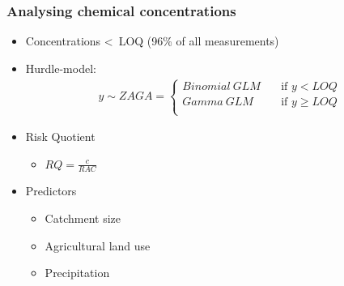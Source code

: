 \documentclass[
	12pt
	]{beamer}
\begin{document}
\begin{frame}
\frametitle{Analysing chemical concentrations}
	\begin{itemize}
		\pause
		\item Concentrations \textless~LOQ (96\% of all measurements)
		\pause
		\item Hurdle-model: 
			\begin{align*}
			y \sim ZAGA = 
			  \begin{cases}
			    Binomial~GLM   & \quad  \text{if } y < LOQ \\
			    Gamma~GLM & \quad \text{if } y \ge LOQ \\
			  \end{cases}
			\end{align*}
		\pause
		\item Risk Quotient
			\begin{itemize}
				\item \large $RQ = \frac{c}{RAC}$
			\end{itemize}
			\vspace*{1em}
		\pause
		\item Predictors
		    \begin{itemize}
				\item Catchment size 
				\item Agricultural land use
				\item Precipitation
			\end{itemize}
	\end{itemize}
\end{frame}
\end{document}
